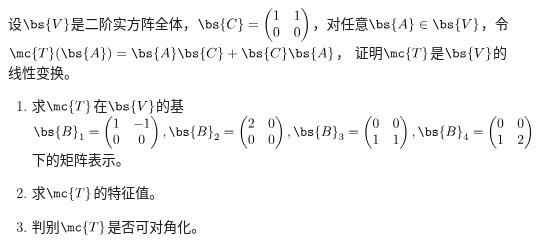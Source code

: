 \documentclass[12pt, a4paper, oneside, UTF8]{ctexbook}
\begin{document}
\begin{question}
    设$\bs{V}$是二阶实方阵全体，$\bs{C}=\begin{pmatrix}
        1&1\\
        0&0
    \end{pmatrix}$，对任意$\bs{A}\in \bs{V}$，令$\mc{T}(\bs{A})=\bs{A}\bs{C}+\bs{C}\bs{A}$，
    证明$\mc{T}$是$\bs{V}$的线性变换。
    \begin{enumerate}[label=(\arabic{*})]
        \item 求$\mc{T}$在$\bs{V}$的基$\bs{B}_1=\begin{pmatrix}
            1&-1\\
            0&0
        \end{pmatrix},\bs{B}_2=\begin{pmatrix}
            2&0\\
            0&0
        \end{pmatrix},\bs{B}_3=\begin{pmatrix}
            0&0\\
            1&1
        \end{pmatrix},\bs{B}_4=\begin{pmatrix}
            0&0\\
            1&2
        \end{pmatrix}$下的矩阵表示。
        \item 求$\mc{T}$的特征值。
        \item 判别$\mc{T}$是否可对角化。
    \end{enumerate}
\end{question}
\end{document}
